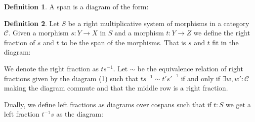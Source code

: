 \documentclass[12pt]{article}
\theoremstyle{definition}
\newtheorem{definition}{Definition}[section]
\theoremstyle{remark}
\begin{document}
            \begin{definition}
                A span is a diagram of the form:
                \begin{center}
                \end{center}
            \end{definition}

            \begin{definition}
                Let $S$ be a right multiplicative system of morphisms in a category $\mathcal{C}$. Given a morphism $s : Y\rightarrow X$ in $S$ and a morphism $t:Y\rightarrow Z$ we define the right fraction of $s$ and $t$ to be the span of the morphisms. That is $s$ and $t$ fit in the diagram:
                \begin{center}
                \end{center}
                We denote the right fraction as $ts^{-1}$.
                Let $\sim$ be the equivalence relation of right fractions given by the diagram (1) such that $ts^{-1}\sim t's'^{-1}$ if and only if $\exists w,w':\mathcal{C}$ making the diagram commute and that the middle row is a right fraction.
                \begin{center}
                \end{center}
            \end{definition}

            Dually, we define left fractions as diagrams over cospans such that if $t:S$ we get a left fraction $t^{-1}s$ as the diagram:
            \begin{center}
            \end{center}
\end{document}
